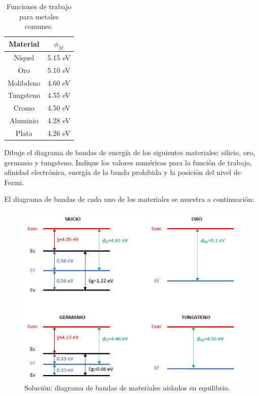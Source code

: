 \begin{table}[H]
    \centering
    \caption{Funciones de trabajo para metales comunes.}
    \label{tabla_constantes_2}
    \begin{tabular}{|c|c|}
        \hline \textbf{Material} & \textbf{$\phi_M$} \\
        \hline 
        Níquel      & 5.15 eV \\
        Oro         & 5.10 eV \\
        Molibdeno   & 4.60 eV \\
        Tungsteno   & 4.55 eV \\
        Cromo       & 4.50 eV \\
        Aluminio    & 4.28 eV \\
        Plata       & 4.26 eV \\
        \hline
    \end{tabular}
\end{table}

\newpage
\begin{ejemplo}
Dibuje el diagrama de bandas de energía de los siguientes materiales: silicio, oro, germanio y tungsteno. Indique los valores numéricos para la función de trabajo, afinidad electrónica, energía de la banda prohibida y la posición del nivel de Fermi.
\end{ejemplo}

\begin{solucion}
El diagrama de bandas de cada uno de los materiales se muestra a continuación:

\begin{figure}[H]
    \centering
    \includegraphics{figuras/bandas_solucion_ejemplo1.png}
    \caption{Solución: diagrama de bandas de materiales aislados en equilibrio.}
    \label{diagrama_bandas_solucion}
\end{figure}
\end{solucion}


